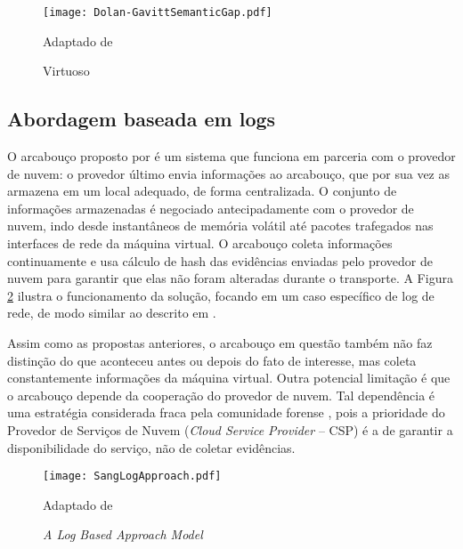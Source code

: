 \begin{figure}[htb!]
\footnotesize
\caption{Virtuoso}
\texttt{[image: Dolan-GavittSemanticGap.pdf]}
\centering
\label{fig:Dolan-GavittSemanticGap}
\begin{center}
Adaptado de \cite{Dolan-GavittSemanticGap:2011} 
\end{center}
\end{figure}


\subsection{Abordagem baseada em logs}
\label{sec:modelologs}

O arcabouço proposto por \cite{SangLogApproach:2013} é um sistema que funciona em parceria com o provedor de nuvem: o provedor último envia informações ao arcabouço, que por sua vez as armazena em um local adequado, de forma centralizada.
%
O conjunto de informações armazenadas é negociado antecipadamente com o provedor de nuvem, indo desde instantâneos de memória volátil até pacotes trafegados nas interfaces de rede da máquina virtual.
%
O arcabouço coleta informações continuamente e usa cálculo de hash das evidências enviadas pelo provedor de nuvem para garantir que elas não foram alteradas durante o transporte.
%
A Figura \ref{fig:SangLogApproach} ilustra o funcionamento da solução, focando em um caso específico de log de rede, de modo similar ao descrito em \cite{SangLogApproach:2013}.


Assim como as propostas anteriores, o arcabouço em questão também não faz distinção do que aconteceu antes ou depois do fato de interesse, mas  coleta constantemente informações da máquina virtual.
%
Outra potencial limitação é que o arcabouço depende da cooperação do provedor de nuvem. 
%
Tal dependência é uma estratégia considerada fraca pela comunidade forense  \cite{ClarkeReviewOfChallenges2015}, pois a prioridade do Provedor de Serviços de Nuvem (\textit{Cloud Service Provider} -- CSP) é a de garantir a disponibilidade do serviço, não de coletar evidências.
%

\begin{figure}[htb!]
\footnotesize
\caption{\textit{A Log Based Approach Model}}
\texttt{[image: SangLogApproach.pdf]}
\centering
\label{fig:SangLogApproach}
\begin{center}
Adaptado de \cite{SangLogApproach:2013} 
\end{center}
\end{figure}


